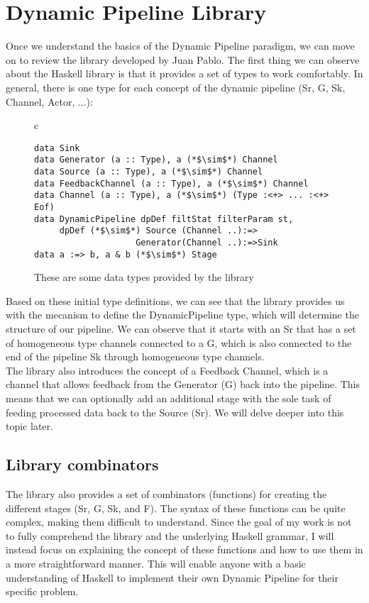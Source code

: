 \section{Dynamic Pipeline Library}
Once we understand the basics of the Dynamic Pipeline paradigm, we can move on to review the library developed by Juan Pablo.
The first thing we can observe about the Haskell library is that it provides a set of types to work comfortably.
In general, there is one type for each concept of the dynamic pipeline (Sr, G, Sk, Channel, Actor, ...):

\begin{figure}[H]
    \begin{tabular}{c}
        \begin{lstlisting}
data Sink
data Generator (a :: Type), a (*$\sim$*) Channel
data Source (a :: Type), a (*$\sim$*) Channel
data FeedbackChannel (a :: Type), a (*$\sim$*) Channel
data Channel (a :: Type), a (*$\sim$*) (Type :<+> ... :<+> Eof)
data DynamicPipeline dpDef filtStat filterParam st, 
     dpDef (*$\sim$*) Source (Channel ..):=> 
                    Generator(Channel ..):=>Sink
data a :=> b, a & b (*$\sim$*) Stage
        \end{lstlisting}
    \end{tabular}
    \caption[{[Code]}Library data types]{These are some data types provided by the library}
    \label{fig:HC1}
\end{figure}

Based on these initial type definitions, we can see that the library provides us with the mecanism to define the DynamicPipeline type, which will determine the structure of our pipeline.
We can observe that it starts with an Sr that has a set of homogeneous type channels connected to a G, which is also connected to the end of the pipeline Sk through homogeneous type channels. \\

The library also introduces the concept of a Feedback Channel, which is a channel that allows feedback from the Generator (G) back into the pipeline.
This means that we can optionally add an additional stage with the sole task of feeding processed data back to the Source (Sr).
We will delve deeper into this topic later.

\subsection{Library combinators}
The library also provides a set of combinators (functions) for creating the different stages (Sr, G, Sk, and F).
The syntax of these functions can be quite complex, making them difficult to understand.
Since the goal of my work is not to fully comprehend the library and the underlying Haskell grammar, I will instead focus on explaining the concept of these functions and how to use them in a more straightforward manner.
This will enable anyone with a basic understanding of Haskell to implement their own Dynamic Pipeline for their specific problem.

